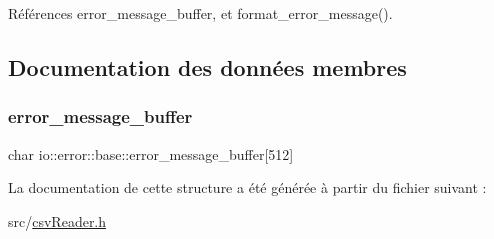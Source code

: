 Références error\+\_\+message\+\_\+buffer, et format\+\_\+error\+\_\+message().



\subsection{Documentation des données membres}
\mbox{\label{structio_1_1error_1_1base_a3be516c4636b7b61133968cb8081c885}} 
\subsubsection{\texorpdfstring{error\+\_\+message\+\_\+buffer}{error\_message\_buffer}}
{\footnotesize\ttfamily char io\+::error\+::base\+::error\+\_\+message\+\_\+buffer\mbox{[}512\mbox{]}\hspace{0.3cm}{\ttfamily [mutable]}}



La documentation de cette structure a été générée à partir du fichier suivant \+:\begin{DoxyCompactItemize}
\item 
src/\hyperlink{csvReader_8h}{csv\+Reader.\+h}\end{DoxyCompactItemize}
